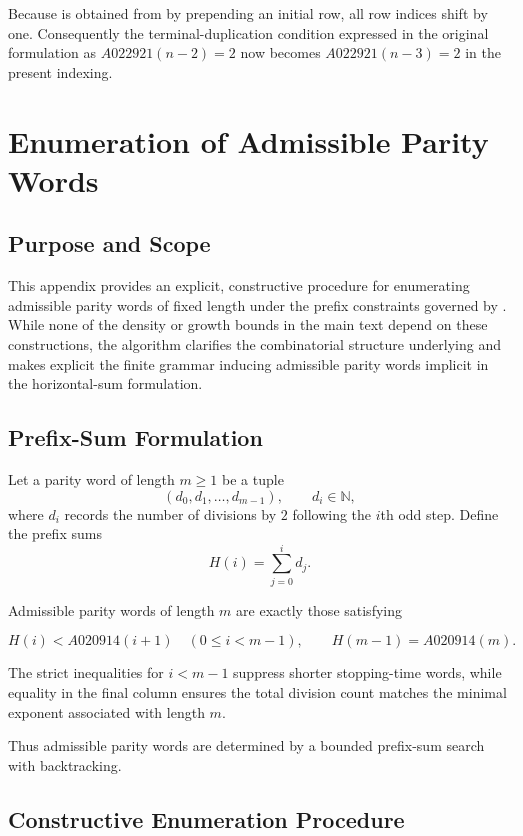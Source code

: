 \documentclass[12pt, oneside]{article}   	%
\numberwithin{equation}{section}          %
\theoremstyle{definition}
\begin{document}
Because  is obtained from  by prepending an initial row, all row indices
shift by one.  Consequently the terminal-duplication condition expressed in the original
formulation as $A022921(n-2)=2$ now becomes $A022921(n-3)=2$ in the present indexing.


\newpage
\section{Enumeration of Admissible Parity Words}
\label{app:parity-enumeration}

\subsection*{Purpose and Scope}

This appendix provides an explicit, constructive procedure for enumerating
admissible parity words of fixed length under the prefix constraints governed by
.  While none of the density or growth bounds in the main text
depend on these constructions, the algorithm clarifies the combinatorial
structure underlying  and makes explicit the finite grammar
inducing admissible parity words implicit in the horizontal-sum formulation.

\subsection*{Prefix-Sum Formulation}

Let a parity word of length $m \ge 1$ be a tuple
\[
(d_0,d_1,\dots,d_{m-1}), \qquad d_i \in \mathbb{N},
\]
where $d_i$ records the number of divisions by $2$ following the $i$th odd step.
Define the prefix sums
\[
H(i) = \sum_{j=0}^{i} d_j .
\]

Admissible parity words of length $m$ are exactly those satisfying

\[
H(i) < A020914(i+1) \quad (0 \le i < m-1), 
\qquad
H(m-1) = A020914(m).
\]

The strict inequalities for $i<m-1$ suppress shorter stopping-time words,
while equality in the final column ensures the total division count matches
the minimal exponent associated with length $m$.

Thus admissible parity words are determined by a bounded prefix-sum search
with backtracking.


\subsection*{Constructive Enumeration Procedure}
\end{document}

